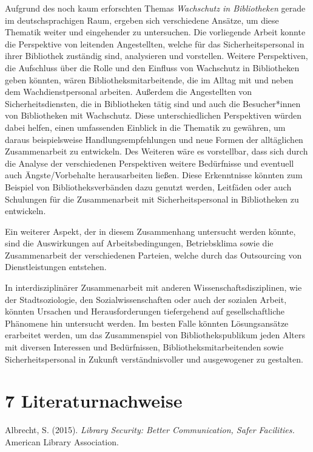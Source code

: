 \documentclass[a4paper,
fontsize=11pt,
oneside,
numbers=noperiodatend,
parskip=half-,
bibliography=totoc,
final
]{scrartcl}
\begin{document}
Aufgrund des noch kaum erforschten Themas \emph{Wachschutz in
Bibliotheken} gerade im deutschsprachigen Raum, ergeben sich
verschiedene Ansätze, um diese Thematik weiter und eingehender zu
untersuchen. Die vorliegende Arbeit konnte die Perspektive von leitenden
Angestellten, welche für das Sicherheitspersonal in ihrer Bibliothek
zuständig sind, analysieren und vorstellen. Weitere Perspektiven, die
Aufschluss über die Rolle und den Einfluss von Wachschutz in
Bibliotheken geben könnten, wären Bibliotheksmitarbeitende, die im
Alltag mit und neben dem Wachdienstpersonal arbeiten. Außerdem die
Angestellten von Sicherheitsdiensten, die in Bibliotheken tätig sind und
auch die Besucher*innen von Bibliotheken mit Wachschutz. Diese
unterschiedlichen Perspektiven würden dabei helfen, einen umfassenden
Einblick in die Thematik zu gewähren, um daraus beispielsweise
Handlungsempfehlungen und neue Formen der alltäglichen Zusammenarbeit zu
entwickeln. Des Weiteren wäre es vorstellbar, dass sich durch die
Analyse der verschiedenen Perspektiven weitere Bedürfnisse und eventuell
auch Ängste/Vorbehalte herausarbeiten ließen. Diese Erkenntnisse könnten
zum Beispiel von Bibliotheksverbänden dazu genutzt werden, Leitfäden
oder auch Schulungen für die Zusammenarbeit mit Sicherheitspersonal in
Bibliotheken zu entwickeln.

Ein weiterer Aspekt, der in diesem Zusammenhang untersucht werden
könnte, sind die Auswirkungen auf Arbeitsbedingungen, Betriebsklima
sowie die Zusammenarbeit der verschiedenen Parteien, welche durch das
Outsourcing von Dienstleistungen entstehen.

In interdisziplinärer Zusammenarbeit mit anderen
Wissenschaftsdisziplinen, wie der Stadtsoziologie, den
Sozialwissenschaften oder auch der sozialen Arbeit, könnten Ursachen und
Herausforderungen tiefergehend auf gesellschaftliche Phänomene hin
untersucht werden. Im besten Falle könnten Lösungsansätze erarbeitet
werden, um das Zusammenspiel von Bibliothekspublikum jeden Alters mit
diversen Interessen und Bedürfnissen, Bibliotheksmitarbeitenden sowie
Sicherheitspersonal in Zukunft verständnisvoller und ausgewogener zu
gestalten.

\hypertarget{literaturnachweise}{%
\section{7 Literaturnachweise}\label{literaturnachweise}}

Albrecht, S. (2015). \emph{Library Security: Better Communication, Safer
Facilities.} American Library Association.
\end{document}
